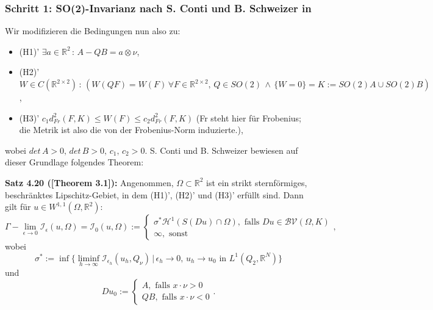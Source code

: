 \subsubsection{Schritt 1: SO(2)-Invarianz nach S. Conti und B. Schweizer in \cite{conti2006rigidity}}
Wir modifizieren die Bedingungen nun also zu:
\begin{itemize}
    \item (H1)' \(\exists a \in \mathbb{R}^2 \, : \, A-QB = a \otimes \nu\),
    \item (H2)' \(W \in C(\mathbb{R}^{2 \times 2}) \, : \, (W(QF) = W(F) \, \forall F \in \mathbb{R}^{2 \times 2}, \, Q \in SO(2) \, \land \, \{W = 0\} = K := SO(2)A \cup SO(2)B)\),
    \item (H3)' \(c_1 d_{Fr}^2(F,K) \leq W(F) \leq c_2 d_{Fr}^2(F,K)\) (Fr steht hier für Frobenius; die Metrik ist also die von der Frobenius-Norm induzierte.),
\end{itemize}
wobei \(det \, A > 0, \, det \, B > 0, \, c_1, \, c_2 > 0\). S. Conti und B. Schweizer bewiesen auf dieser Grundlage folgendes Theorem:\\[0.5cm]
\colorbox{generalYellow}{\begin{minipage}{16cm}{\textcolor{black}{}{\label{theo4.20}}}
\textbf{Satz 4.20 (\cite{conti2006rigidity}[Theorem 3.1]):} Angenommen, \(\Omega \subset \mathbb{R}^2\) ist ein strikt sternförmiges, beschränktes Lipschitz-Gebiet, in dem (H1)', (H2)' und (H3)' erfüllt sind. Dann gilt für \(u \in W^{1,1}(\Omega, \mathbb{R}^2)\):
\begin{equation}
    \Gamma-\lim_{\epsilon \to 0} \mathcal{I}_{\epsilon} (u,\Omega) = \mathcal{I}_0(u,\Omega) := \begin{cases}
        \sigma^* \mathcal{H}^1(S(Du) \cap \Omega), \text{ falls } Du \in \mathcal{BV}(\Omega,K) \\
        \infty, \text{ sonst}
    \end{cases},
\end{equation}
wobei
\begin{equation}
    \sigma^* := \inf \{\liminf_{h \to \infty} \mathcal{I}_{\epsilon_h} (u_h,Q_{\nu}) \, | \, \epsilon_h \to 0, \, u_h \to u_0 \text{ in }L^1(Q_2,\mathbb{R}^N)\}
\end{equation}
und
\begin{equation}
    Du_0 := \begin{cases}
        A, \text{ falls } x \cdot \nu > 0 \\
        QB, \text{ falls } x \cdot \nu < 0
    \end{cases}.
\end{equation}
\end{minipage}}

